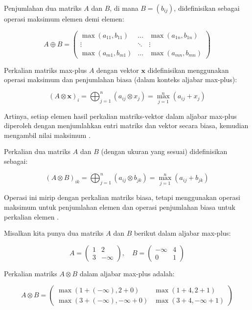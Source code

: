 \documentclass{file/TA-ITS}
\theoremstyle{definition}
\theoremstyle{definition}
\theoremstyle{plain}
\begin{document}
Penjumlahan dua matriks \( A \) dan \( B \), di mana \( B = (b_{ij}) \), didefinisikan sebagai operasi maksimum elemen demi elemen:

\[
A \oplus B = \begin{pmatrix} \max(a_{11}, b_{11}) & \dots & \max(a_{1n}, b_{1n}) \\ \vdots & \ddots & \vdots \\ \max(a_{m1}, b_{m1}) & \dots & \max(a_{mn}, b_{mn}) \end{pmatrix}
\]

Perkalian matriks max-plus \( A \) dengan vektor \( \mathbf{x} \) didefinisikan menggunakan operasi maksimum dan penjumlahan biasa (dalam konteks aljabar max-plus):

\[
(A \otimes \mathbf{x})_i = \bigoplus_{j=1}^n (a_{ij} \otimes x_j) = \max_{j=1}^n (a_{ij} + x_j)
\]

Artinya, setiap elemen hasil perkalian matriks-vektor dalam aljabar max-plus diperoleh dengan menjumlahkan entri matriks dan vektor secara biasa, kemudian mengambil nilai maksimum \cite{subionopower}.

Perkalian dua matriks \( A \) dan \( B \) (dengan ukuran yang sesuai) didefinisikan sebagai:

\[
(A \otimes B)_{ik} = \bigoplus_{j=1}^n (a_{ij} \otimes b_{jk}) = \max_{j=1}^n (a_{ij} + b_{jk})
\]

Operasi ini mirip dengan perkalian matriks biasa, tetapi menggunakan operasi maksimum untuk penjumlahan elemen dan operasi penjumlahan biasa untuk perkalian elemen \cite{butkovic2010maxplus}.

Misalkan kita punya dua matriks \( A \) dan \( B \) berikut dalam aljabar max-plus:

\[
A = \begin{pmatrix} 1 & 2 \\ 3 & -\infty \end{pmatrix}, \quad B = \begin{pmatrix} -\infty & 4 \\ 0 & 1 \end{pmatrix}
\]

Perkalian matriks \( A \otimes B \) dalam aljabar max-plus adalah:

\[
A \otimes B = \begin{pmatrix} \max(1 + (-\infty), 2 + 0) & \max(1 + 4, 2 + 1) \\ \max(3 + (-\infty), -\infty + 0) & \max(3 + 4, -\infty + 1) \end{pmatrix}
\]
\end{document}
